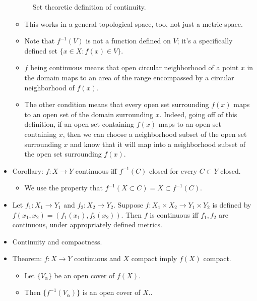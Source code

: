\documentclass[../../notes.tex]{subfiles}
\begin{document}
\begin{itemize}
\begin{figure}[h!]
        \caption{Set theoretic definition of continuity.}
        \label{fig:continuityOpenSets}
    \end{figure}
    \begin{itemize}
        \item This works in a general topological space, too, not just a metric space.
        \item Note that $f^{-1}(V)$ is not a function defined on $V$; it's a specifically defined set $\{x\in X:f(x)\in V\}$.
        \item $f$ being continuous means that open circular neighborhood of a point $x$ in the domain maps to an area of the range encompassed by a circular neighborhood of $f(x)$.
        \item The other condition means that every open set surrounding $f(x)$ maps to an open set of the domain surrounding $x$. Indeed, going off of this definition, if an open set containing $f(x)$ maps to an open set containing $x$, then we can choose a neighborhood subset of the open set surrounding $x$ and know that it will map into a neighborhood subset of the open set surrounding $f(x)$. 
    \end{itemize}
    \item Corollary: $f:X\to Y$ continuous iff $f^{-1}(C)$ closed for every $C\subset Y$ closed.
    \begin{itemize}
        \item We use the property that $f^{-1}(X\subset C)=X\subset f^{-1}(C)$.
    \end{itemize}
    \item Let $f_1:X_1\to Y_1$ and $f_2:X_2\to Y_2$. Suppose $f:X_1\times X_2\to Y_1\times Y_2$ is defined by $f(x_1,x_2)=(f_1(x_1),f_2(x_2))$. Then $f$ is continuous iff $f_1,f_2$ are continuous, under appropriately defined metrics.
    \item Continuity and compactness.
    \item Theorem: $f:X\to Y$ continuous and $X$ compact imply $f(X)$ compact.
    \begin{itemize}
        \item Let $\{V_\alpha\}$ be an open cover of $f(X)$.
        \item Then $\{f^{-1}(V_\alpha)\}$ is an open cover of $X$..

\end{itemize}
\end{itemize}
\end{document}
